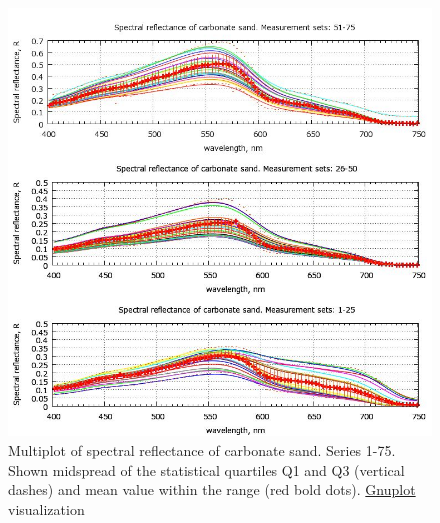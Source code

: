 \documentclass[10pt, a4paper]{article}
\begin{document}
\begin{figure}
	\begin{center}
		\includegraphics[scale=0.5]{GNU-16.jpg}
		\caption{Multiplot of spectral reflectance of carbonate sand. Series 1-75. Shown midspread of the statistical quartiles Q1 and Q3 (vertical dashes) and
			mean value within the range (red bold dots). \href{http://www.gnuplot.info/}{Gnuplot} visualization­}
		\label{fig:4.14}
	\end{center}
\end{figure}
\end{document}
